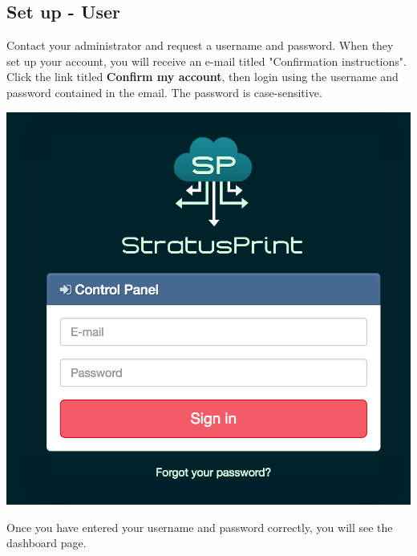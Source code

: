   \subsection{Set up - User}
      Contact your administrator and request a username and password. When they set up your account,
      you will receive an e-mail titled "Confirmation instructions".  Click the link titled \textbf{Confirm
      my account}, then login using the username and password contained in the email.  The password is case-sensitive.
      \begin{center}
      \includegraphics[scale=.5]{images/login.png}
    \end{center}
      Once you have entered your username and password correctly, you will see the dashboard page.

\newpage
